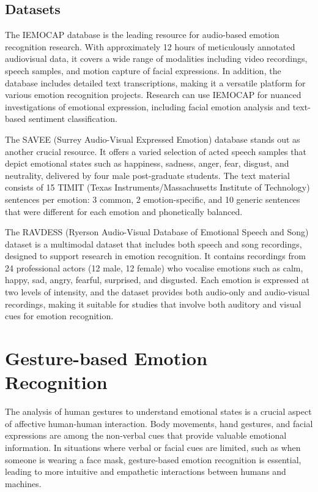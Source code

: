 \subsection{Datasets}

The IEMOCAP database \cite{Busso2008-qj} is the leading resource for audio-based emotion recognition research. With approximately 12 hours of meticulously annotated audiovisual data, it covers a wide range of modalities including video recordings, speech samples, and motion capture of facial expressions. In addition, the database includes detailed text transcriptions, making it a versatile platform for various emotion recognition projects. Research can use IEMOCAP for nuanced investigations of emotional expression, including facial emotion analysis and text-based sentiment classification.

The SAVEE (Surrey Audio-Visual Expressed Emotion) database \cite{HaqJackson_AVSP09} stands out as another crucial resource. It offers a varied selection of acted speech samples that depict emotional states such as happiness, sadness, anger, fear, disgust, and neutrality, delivered by four male post-graduate students. The text material consists of 15 TIMIT (Texas Instruments/Massachusetts Institute of Technology) sentences per emotion: 3 common, 2 emotion-specific, and 10 generic sentences that were different for each emotion and phonetically balanced.

The RAVDESS (Ryerson Audio-Visual Database of Emotional Speech and Song) dataset \cite{Livingstone2018-li} is a multimodal dataset that includes both speech and song recordings, designed to support research in emotion recognition. It contains recordings from 24 professional actors (12 male, 12 female) who vocalise emotions such as calm, happy, sad, angry, fearful, surprised, and disgusted. Each emotion is expressed at two levels of intensity, and the dataset provides both audio-only and audio-visual recordings, making it suitable for studies that involve both auditory and visual cues for emotion recognition.

\section{Gesture-based Emotion Recognition}

The analysis of human gestures to understand emotional states is a crucial aspect of affective human-human interaction. Body movements, hand gestures, and facial expressions are among the non-verbal cues that provide valuable emotional information. In situations where verbal or facial cues are limited, such as when someone is wearing a face mask, gesture-based emotion recognition is essential, leading to more intuitive and empathetic interactions between humans and machines.

